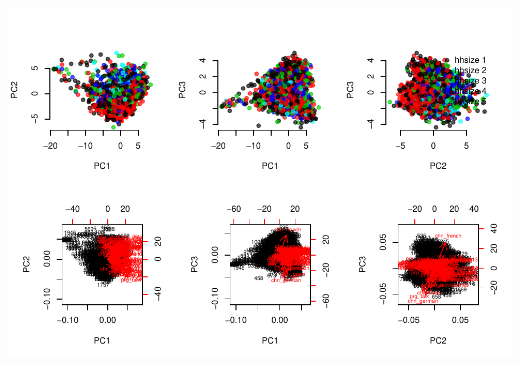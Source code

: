 \documentclass[]{article}
\begin{document}
\includegraphics{Diploma_files/figure-latex/unnamed-chunk-6-1.pdf}
\end{document}
